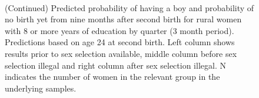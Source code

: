 \documentclass[12pt,letterpaper]{article}
\begin{document}
\begin{figure}[htpb]
{\begin{minipage}{0.31\textwidth}
        \captionsetup[subfigure]{labelformat=empty,position=top,captionskip=-1pt,farskip=-0.5pt}
        \\
        \captionsetup[subfigure]{labelformat=parens}
    \end{minipage}
}
\setcounter{subfigure}{6}
\caption{(Continued) Predicted probability of having a boy and probability of
no birth yet from nine months after second birth for rural
women with 8 or more years of education by quarter (3 month period). 
Predictions based on age 24 at second birth.
Left column shows results prior to sex selection available, middle column before
sex selection illegal and right column after sex selection illegal.
N indicates the number of women in the relevant group in the underlying samples.
}
\end{figure}


\clearpage
\end{document}
